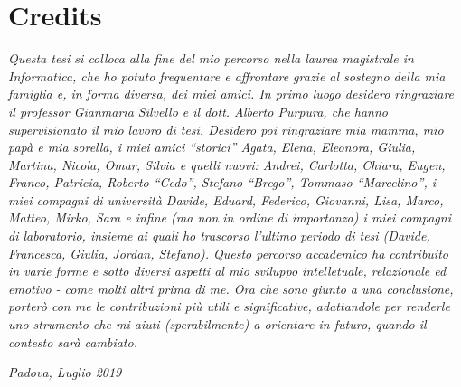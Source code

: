 \cleardoublepage
{}
\thispagestyle{empty}


\begingroup
\let\clearpage\relax
\let\cleardoublepage\relax
\let\cleardoublepage\relax

\section*{Credits}

\noindent \textit{Questa tesi si colloca alla fine del mio percorso nella laurea magistrale in Informatica, che ho potuto frequentare e affrontare grazie al sostegno della mia famiglia e, in forma diversa, dei miei amici.
In primo luogo desidero ringraziare il professor Gianmaria Silvello e il dott. Alberto Purpura, che hanno supervisionato il mio lavoro di tesi.
Desidero poi ringraziare mia mamma, mio papà e mia sorella, i miei amici ``storici'' Agata, Elena, Eleonora, Giulia, Martina, Nicola, Omar, Silvia e quelli nuovi: Andrei, Carlotta, Chiara, Eugen, Franco, Patricia, Roberto ``Cedo'', Stefano ``Brego'', Tommaso ``Marcelino'', i miei compagni di università Davide, Eduard, Federico, Giovanni, Lisa, Marco, Matteo, Mirko, Sara e infine (ma non in ordine di importanza) i miei compagni di laboratorio, insieme ai quali ho trascorso l'ultimo periodo di tesi (Davide, Francesca, Giulia, Jordan, Stefano).
Questo percorso accademico ha contribuito in varie forme e sotto diversi aspetti al mio sviluppo intelletuale, relazionale ed emotivo - come molti altri prima di me. Ora che sono giunto a una conclusione, porterò con me le contribuzioni più utili e significative, adattandole per renderle uno strumento che mi aiuti (sperabilmente) a orientare in futuro, quando il contesto sarà cambiato.}\\
\bigskip

\noindent\textit{Padova, Luglio 2019}
\hfill \myName

\endgroup

